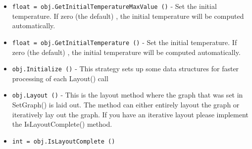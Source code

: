 \begin{itemize}
\item  \verb|float = obj.GetInitialTemperatureMaxValue ()| -  Set the initial temperature.  If zero (the default) , the initial temperature
 will be computed automatically.

\item  \verb|float = obj.GetInitialTemperature ()| -  Set the initial temperature.  If zero (the default) , the initial temperature
 will be computed automatically.

\item  \verb|obj.Initialize ()| -  This strategy sets up some data structures
 for faster processing of each Layout() call

\item  \verb|obj.Layout ()| -  This is the layout method where the graph that was
 set in SetGraph() is laid out. The method can either
 entirely layout the graph or iteratively lay out the
 graph. If you have an iterative layout please implement
 the IsLayoutComplete() method.

\item  \verb|int = obj.IsLayoutComplete ()|

\end{itemize}
